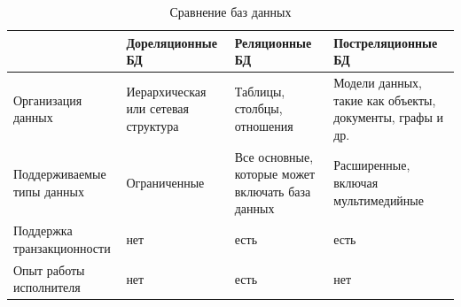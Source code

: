 \begin{table}[h]
	\begin{center}
		\begin{threeparttable}
			\captionsetup{justification=raggedright,singlelinecheck=off}
			\caption{\label{tbl:bds} Сравнение баз данных}
			\begin{tabular}{|p{3.5cm}|p{3.5cm}|p{3.5cm}|p{3.8cm}|}
				\hline
				& Дореляционные БД & Реляционные БД & Постреляционные БД \\
				\hline
				Организация данных & Иерархическая или сетевая структура & Таблицы, столбцы, отношения & Модели данных, такие как объекты, документы, графы и др. \\
				\hline
				Поддерживаемые типы данных & Ограниченные & Все основные, которые может включать база данных & Расширенные, включая мультимедийные \\
				\hline
				Поддержка транзакционности & нет & есть & есть \\
				\hline
				Опыт работы исполнителя & нет & есть & нет \\
				\hline
			\end{tabular}
		\end{threeparttable}
\end{center}
\end{table}